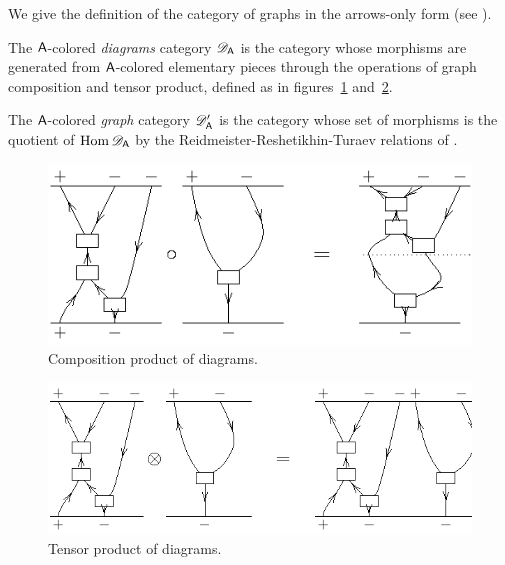 We give the definition of the category of graphs in the arrows-only
form (see ). 
\begin{definition}
  The $\A$-colored \emph{diagrams} category $\RTD[\A]$ is the category
  whose morphisms are generated from $\A$-colored elementary pieces
  through the operations of graph composition and tensor product,
  defined as in figures~\ref{fig:gc-graph-composition}
  and~\ref{fig:gc-graph-otimes}.
  
  The $\A$-colored \emph{graph} category $\RTE[\A]$ is the category
  whose set of morphisms is the quotient of $\Hom\RTD[\A]$ by the
  Reidmeister-Reshetikhin-Turaev relations of .
\end{definition}
\begin{figure}[p]
  \centering\includegraphics{fig-001}
  \caption{Composition product of diagrams.}
  \label{fig:gc-graph-composition}
\end{figure}
\begin{figure}[p]
  \centering\includegraphics{fig-002}
  \caption{Tensor product of diagrams.}
  \label{fig:gc-graph-otimes}
\end{figure}
